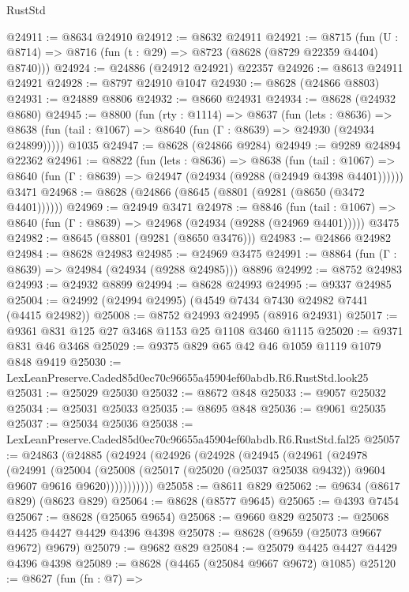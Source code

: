 \begin{lexlean}{RustStd}
\begin{coremodule}
@24911 := @8634 @24910
@24912 := @8632 @24911
@24921 := @8715
    (fun (U : @8714) => @8716 (fun (t : @29) => @8723 (@8628 (@8729 @22359 @4404) @8740)))
@24924 := @24886 (@24912 @24921) @22357
@24926 := @8613 @24911 @24921
@24928 := @8797 @24910 @1047
@24930 := @8628 (@24866 @8803)
@24931 := @24889 @8806
@24932 := @8660 @24931
@24934 := @8628 (@24932 @8680)
@24945 := @8800
    (fun (rty : @1114) =>
    @8637
      (fun (lets : @8636) =>
      @8638 (fun (tail : @1067) => @8640 (fun (Γ : @8639) => @24930 (@24934 @24899)))))
    @1035
@24947 := @8628 (@24866 @9284)
@24949 := @9289 @24894 @22362
@24961 := @8822
    (fun (lets : @8636) =>
    @8638
      (fun (tail : @1067) =>
      @8640 (fun (Γ : @8639) => @24947 (@24934 (@9288 (@24949 @4398 @4401))))))
    @3471
@24968 := @8628 (@24866 (@8645 (@8801 (@9281 (@8650 (@3472 @4401))))))
@24969 := @24949 @3471
@24978 := @8846
    (fun (tail : @1067) => @8640 (fun (Γ : @8639) => @24968 (@24934 (@9288 (@24969 @4401)))))
    @3475
@24982 := @8645 (@8801 (@9281 (@8650 @3476)))
@24983 := @24866 @24982
@24984 := @8628 @24983
@24985 := @24969 @3475
@24991 := @8864 (fun (Γ : @8639) => @24984 (@24934 (@9288 @24985))) @8896
@24992 := @8752 @24983
@24993 := @24932 @8899
@24994 := @8628 @24993
@24995 := @9337 @24985
@25004 := @24992 (@24994 @24995) (@4549 @7434 @7430 @24982 @7441 (@4415 @24982))
@25008 := @8752 @24993 @24995 (@8916 @24931)
@25017 := @9361 @831 @125 @27 @3468 @1153 @25 @1108 @3460 @1115
@25020 := @9371 @831 @46 @3468
@25029 := @9375 @829 @65 @42 @46 @1059 @1119 @1079 @848 @9419
@25030 := LexLeanPreserve.Caded85d0ec70c96655a45904ef60abdb.R6.RustStd.look25
@25031 := @25029 @25030
@25032 := @8672 @848
@25033 := @9057 @25032
@25034 := @25031 @25033
@25035 := @8695 @848
@25036 := @9061 @25035
@25037 := @25034 @25036
@25038 := LexLeanPreserve.Caded85d0ec70c96655a45904ef60abdb.R6.RustStd.fal25
@25057 := @24863
    (@24885
      (@24924
        (@24926
          (@24928
            (@24945
              (@24961
                (@24978
                  (@24991
                    (@25004
                      (@25008
                        (@25017 (@25020 (@25037 @25038 @9432)) @9604 @9607 @9616 @9620)))))))))))
@25058 := @8611 @829
@25062 := @9634 (@8617 @829) (@8623 @829)
@25064 := @8628 (@8577 @9645)
@25065 := @4393 @7454
@25067 := @8628 (@25065 @9654)
@25068 := @9660 @829
@25073 := @25068 @4425 @4427 @4429 @4396 @4398
@25078 := @8628 (@9659 (@25073 @9667 @9672) @9679)
@25079 := @9682 @829
@25084 := @25079 @4425 @4427 @4429 @4396 @4398
@25089 := @8628 (@4465 (@25084 @9667 @9672) @1085)
@25120 := @8627
    (fun (fn : @7) =>

\end{coremodule}
\end{lexlean}
